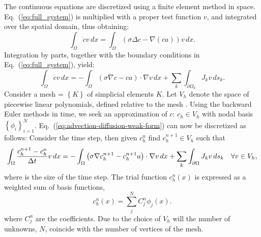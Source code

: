 The continuous equations are discretized using a finite element method in space. Eq.~(\ref{eq:full_system}) is multiplied with a proper test function $v$, and integrated over the spatial domain, thus obtaining:
\begin{equation}
  \label{eq:advection-diffusion-weak-form-0}
  \int_\Omega\dot{c}v\,dx = \int_\Omega \left(\sigma\Delta c-\nabla(ca)\right) v\,dx.
\end{equation}
Integration by parts, together with the boundary conditions in Eq.~(\ref{eq:full_system}), yield:
\begin{equation}
  \label{eq:advection-diffusion-weak-form}
  \int_\Omega\dot{c}v\,dx = -\int_\Omega \left(\sigma\nabla c-ca\right)\cdot\nabla v\,dx + \sum_k\int_{\partial\Omega_k} J_kv\,ds_k.
\end{equation}
Consider a mesh \T = $\left\{K\right\}$ of simplicial elements $K$. Let $V_h$ denote the space of piecewise linear polynomials, defined relative to the mesh \T. Using the backward Euler methods in time, we seek an approximation of $c$: $c_h\in V_h$ with nodal basis $\left\{\phi_i\right\}^N_{i=1}$. Eq.~(\ref{eq:advection-diffusion-weak-form}) can now be discretized as follows: Consider the \nth time step, then given $c_h^n$ find $c_h^{n+1} \in V_h$ such that
\begin{equation}
  \label{eq:advection-diffusion-weak-discrete-form}
  \int_{\Omega} \frac{c_h^{n+1}-c_h^{n}}{\Delta{}t}v\,dx = -\int_{\Omega} \left(\sigma\nabla c_h^{n+1}-c_h^{n+1}a\right)\cdot\nabla v\,dx + \sum_k\int_{\partial\Omega} J_kv\,ds_{k}\quad\forall v \in V_h,
\end{equation}
where \Dt is the size of the time step. The trial function $c^n_h(x)$ is expressed as a weighted sum of basis functions,
\begin{equation}
  \label{eq:discrete-solution}
  c^n_h(x) = \sum^N_j C_j^n\phi_j(x).
\end{equation}
where $C_j^n$ are the coefficients. Due to the choice of $V_h$ will the number of unknowns, $N$, coincide with the number of vertices of the mesh.\par

